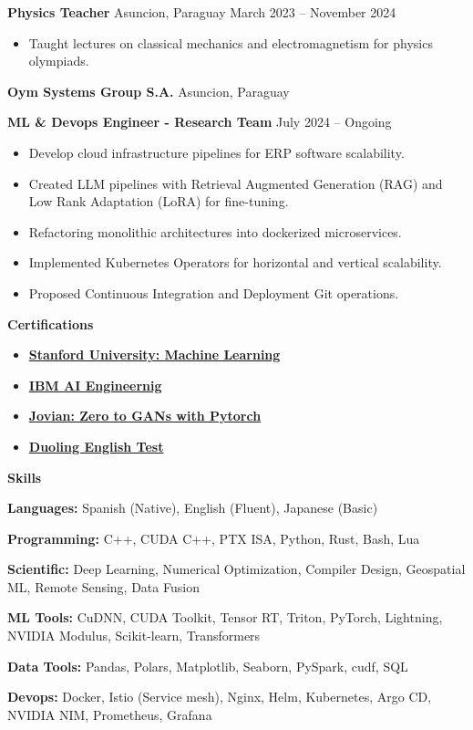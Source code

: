 \documentclass[11pt]{article}
\begin{document}
\textbf{Physics Teacher}	\hfill Asuncion, Paraguay
\hfill March 2023 – November 2024
\begin{itemize}[noitemsep]
  \item Taught lectures on classical mechanics and electromagnetism for physics olympiads.
\end{itemize}

\textbf{Oym Systems Group S.A.}	\hfill Asuncion, Paraguay

\textbf{ML \& Devops Engineer - Research Team} \hfill July 2024 – Ongoing
\begin{itemize}[noitemsep]
  \item Develop cloud infrastructure pipelines for ERP software scalability.
  \item Created LLM pipelines with Retrieval Augmented Generation (RAG) and Low Rank Adaptation (LoRA) for fine-tuning.
  \item Refactoring monolithic architectures into dockerized microservices.
  \item Implemented Kubernetes Operators for horizontal and vertical scalability.
  \item Proposed Continuous Integration and Deployment Git operations.
\end{itemize}

\begin{center}
    \textbf{Certifications}
\end{center}

\begin{itemize}
    \item \href{https://www.coursera.org/account/accomplishments/specialization/certificate/VNCPL4MXPB5A}{\textbf{Stanford University: Machine Learning}}
    \item \href{https://www.coursera.org/account/accomplishments/specialization/certificate/JEYSUHXTCYU5}{\textbf{IBM AI Engineernig}}
    \item \href{https://jovian.com/certificate/MFQTQMZXGM}{\textbf{Jovian: Zero to GANs with Pytorch}}
    \item \href{https://certs.duolingo.com/vc54x03gh7zcprnd}{\textbf{Duoling English Test}}
\end{itemize}


\begin{center}
    \textbf{Skills}
\end{center}

\textbf{Languages:} Spanish (Native), English (Fluent), Japanese (Basic)

\textbf{Programming:} C++, CUDA C++, PTX ISA, Python, Rust, Bash, Lua

\textbf{Scientific:} Deep Learning, Numerical Optimization, Compiler Design, Geospatial ML, Remote Sensing, Data Fusion

\textbf{ML Tools:} CuDNN, CUDA Toolkit, Tensor RT, Triton, PyTorch, Lightning, NVIDIA Modulus, Scikit-learn, Transformers

\textbf{Data Tools:} Pandas, Polars, Matplotlib, Seaborn, PySpark, cudf, SQL

\textbf{Devops:} Docker, Istio (Service mesh), Nginx, Helm, Kubernetes, Argo CD, NVIDIA NIM, Prometheus, Grafana



\end{document}
